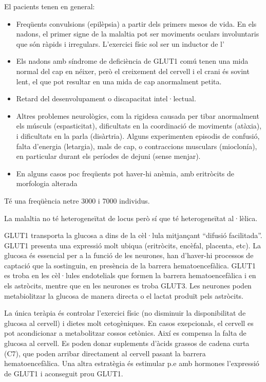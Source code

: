 El pacients tenen en general:
\begin{itemize}
\item Freqüents convulsions (epilèpsia) a partir dels primers mesos de vida. En els nadons, el primer signe de la malaltia pot ser moviments oculars involuntaris que són ràpids i irregulars. L’exercici físic sol ser un inductor de l’

\item Els nadons amb síndrome de deficiència de GLUT1 comú tenen una mida normal del cap en néixer, però el creixement del cervell i el crani és sovint lent, el que pot resultar en una mida de cap anormalment petita.

\item Retard del desenvolupament o discapacitat intel·lectual.

\item Altres problemes neurològics, com la rigidesa causada per tibar anormalment els músculs (espasticitat), dificultats en la coordinació de moviments (atàxia), i dificultats en la parla (disàrtria). Alguns experimenten episodis de confusió, falta d'energia (letargia), mals de cap, o contraccions musculars (mioclonía), en particular durant els períodes de dejuni (sense menjar).

\item En alguns casos poc freqüents pot haver-hi anèmia, amb eritròcits de morfologia alterada 
\end{itemize}

Té una freqüència netre 3000 i 7000 individus.

La malaltia no té heterogeneïtat de locus però sí que té heterogeneïtat al·lèlica.

GLUT1 transporta la glucosa a dins de la cèl·lula mitjançant ``difusió facilitada''. GLUT1 presenta una expressió molt ubiqua (eritròcits, encèfal, placenta, etc). La glucosa és essencial per a la funció de les neurones, han d'haver-hi processos de captació que la sostinguin, en presència de la barrera hematoencefàlica. GLUT1 es troba en les cèl·lules endotelials que formen la barrera hematoencefàlica i en els astròcits, mentre que en les neurones es troba GLUT3. Les neurones poden metabiolitzar la glucosa de manera directa o el lactat produït pels astròcits. 

La única teràpia és controlar l'exercici físic (no disminuir la disponibilitat de glucosa al cervell) i dietes molt cetogèniques. En casos exepcionals, el cervell es pot acondicionar a metabolitzar cossos cetònics. Així es compensa la falta de glucosa al cervell. Es poden donar suplements d'àcids grassos de cadena curta (C7), que poden arribar directament al cervell pasant la barrera hematoencefàlica. Una altra estratègia és estimular p.e amb hormones l'expressió de GLUT1 i aconseguit prou GLUT1.

